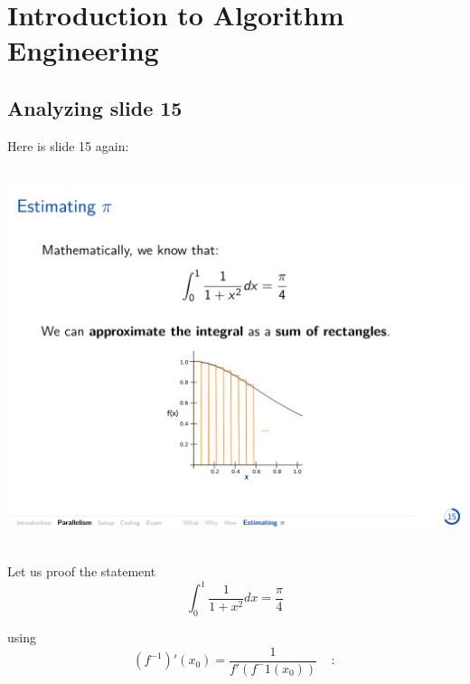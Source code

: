 \documentclass[../../main.tex]{subfiles}
\begin{document}
\section{Introduction to Algorithm Engineering}
\subsection{Analyzing slide 15}
Here is slide 15 again:

~\\
\includegraphics[width=\textwidth]{page_15.png}

~\\
Let us proof the statement
\[
    \int_{0}^{1}\frac{1}{1+x^2} dx = \frac{\pi}{4}
\]

\noindent using
\[
    (f^{-1})'(x_0) = \frac{1}{f'(f^-1(x_0))} \ \ \ \ \ :
\]
\end{document}
